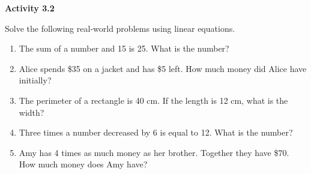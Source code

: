  \vspace{1ex}
\noindent\textbf{Activity 3.2}

\vspace{0.75ex}

Solve the following real-world problems using linear equations. 

\begin{enumerate}[noitemsep, label = \color{blue}\arabic*. ]
    \item The sum of a number and 15 is 25. What is the number?
    \item Alice spends \$35 on a jacket and has \$5 left. How much money did Alice have initially?
    \item The perimeter of a rectangle is 40 cm. If the length is 12 cm, what is the width?
    \item Three times a number decreased by 6 is equal to 12. What is the number?
    \item Amy has 4 times as much money as her brother. Together they have \$70. How much money does Amy have?
\end{enumerate}
